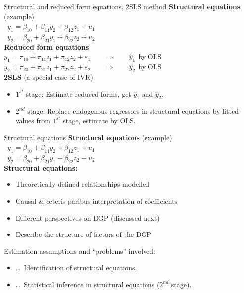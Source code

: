 \documentclass[usenames,dvipsnames]{beamer}
\begin{document}
\begin{frame}{Structural and reduced form equations, 2SLS method}
\textbf{Structural equations} (example)\\
\medskip
\quad \ $y_1  = \beta_{10} + \beta_{11} y_2 + \beta_{12} z_1 + u_1 $ \\
\medskip
\quad \ $y_2  = \beta_{20}+\beta_{21} y_1 + \beta_{22} z_2 + u_2 $ \\
\bigskip 
\textbf{Reduced form equations}\\
\medskip
\quad $y_1 = \pi_{10} + \pi_{11} z_1 + \pi_{12} z_2 + \varepsilon_1 \qquad 
\Rightarrow  \qquad \hat{y}_1~~$by OLS\\
\medskip
\quad $y_2 = \pi_{20} + \pi_{21} z_1 + \pi_{22} z_2 + \varepsilon_2 \qquad 
\Rightarrow  \qquad \hat{y}_2~~$by OLS\\
\bigskip 
\textbf{2SLS} (a special case of IVR)\\
\begin{itemize}
\item $1^{st}$ stage: Estimate reduced forms, get $\hat{y}_1$ and $\hat{y}_2$.
\item $2^{nd}$ stage: Replace endogenous regressors in structural equations by fitted values from $1^{st}$ stage, estimate by OLS.\\
\end{itemize}
\end{frame}
\begin{frame}{Structural equations}
\textbf{Structural equations} (example)\\
\medskip
\quad \ $y_1  = \beta_{10} + \beta_{11} y_2 + \beta_{12} z_1 + u_1 $ \\
\medskip
\quad \ $y_2  = \beta_{20}+\beta_{21} y_1 + \beta_{22} z_2 + u_2 $ \\
\bigskip
\textbf{Structural equations:}\\
\medskip
\begin{itemize}
    \item Theoretically defined relationships modelled
    \item Causal \& ceteris paribus interpretation of coefficients
    \item Different perspectives on DGP (discussed next)
    \item Describe the structure of factors of the DGP
\end{itemize}
\bigskip
Estimation assumptions and ``problems'' involved:
\begin{itemize}
\item[] \dots ~Identification of structural equations, \\
\item[] \dots ~Statistical inference in structural equations ($2^{nd}$ stage).
\end{itemize}
\end{frame}
\end{document}
